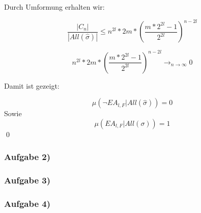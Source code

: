 \documentclass[12pt]{article}
\begin{document}
Durch Umformung erhalten wir:

\[ \frac{|C_n|}{|All(\hat \sigma)|} \leq n^{2l}*2m*(\frac{m*2^{2l}-1}{2^{2l}})^{n-2l} \] 

\[ n^{2l}*2m*(\frac{m*2^{2l}-1}{2^{2l}})^{n-2l} \longrightarrow_{n \rightarrow \infty} 0\] 

Damit ist gezeigt: 

\[ \mu(\neg EA_{l,F}|All(\hat \sigma)) = 0 \]
Sowie
\[ \mu(EA_{l,F}|All(\sigma)) = 1 \]
\qed

\subsubsection*{Aufgabe 2)}


\subsubsection*{Aufgabe 3)}

\subsubsection*{Aufgabe 4)}
\end{document}
